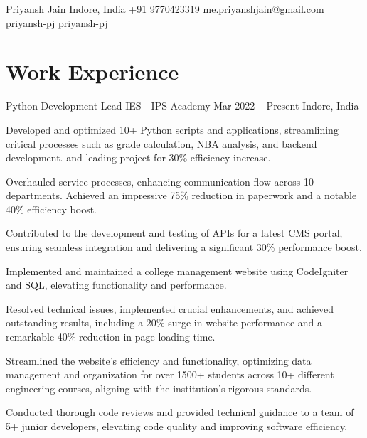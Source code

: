 \documentclass[letterpaper]{config}
\begin{document}
\Header
    {Priyansh Jain} %
    {Indore, India}
    {+91 9770423319} %
    {me.priyanshjain@gmail.com} %
    {priyansh-pj} %
    {priyansh-pj}

\section{Work Experience}
\WorkExperience
    {Python Development Lead} %
    {IES - IPS Academy} %
    {Mar 2022 -- Present} %
    {Indore, India} %
    {
        \item Developed and optimized 10+ Python scripts and applications, streamlining critical processes such as grade calculation, NBA analysis, and backend development. and leading project for 30\% efficiency increase.
        \item Overhauled service processes, enhancing communication flow across 10 departments. Achieved an impressive 75\% reduction in paperwork and a notable 40\% efficiency boost.
        \item Contributed to the development and testing of APIs for a latest CMS portal, ensuring seamless integration and delivering a significant 30\% performance boost.
        \item Implemented and maintained a college management website using CodeIgniter and SQL, elevating functionality and performance.
        \item Resolved technical issues, implemented crucial enhancements, and achieved outstanding results, including a 20\% surge in website performance and a remarkable 40\% reduction in page loading time.
        \item Streamlined the website's efficiency and functionality, optimizing data management and organization for over 1500+ students across 10+ different engineering courses, aligning with the institution's rigorous standards.
        \item Conducted thorough code reviews and provided technical guidance to a team of 5+ junior developers, elevating code quality and improving software efficiency.
    } 
    
\end{document}
